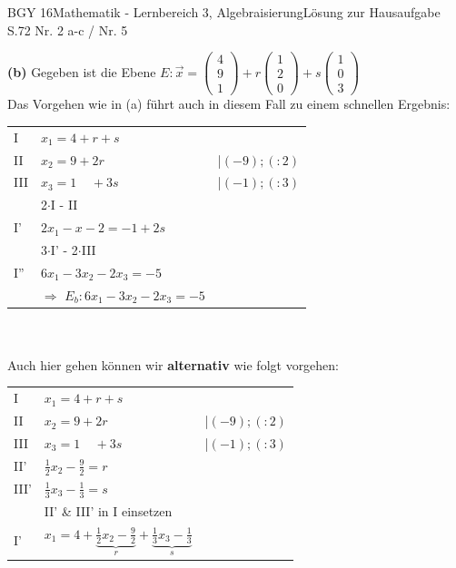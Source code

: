 \documentclass[oneside,openany,headings=optiontotoc,11pt,numbers=noenddot]{scrreprt}
\begin{document}
\begin{worksheet}{BGY 16}{Mathematik - Lernbereich 3, Algebraisierung}{Lösung zur Hausaufgabe S.72 Nr. 2 a-c / Nr. 5}
\begin{framed}
			\textbf{(b)} Gegeben ist die Ebene \(E:\vec{x} = \left(\begin{array}{c}4\\9\\1\end{array}\right) + r\left(\begin{array}{c}1\\2\\0\end{array}\right) + s\left(\begin{array}{c}1\\0\\3\end{array}\right)\)\\
			Das Vorgehen wie in (a) führt auch in diesem Fall zu einem schnellen Ergebnis:\\
			\begin{tabularx}{\textwidth}{lll}
				I & \(x_1 = 4 + r + s\)\\
				II & \(x_2 = 9 + 2r\) & |\((-9); (:2)\)\\
				III& \(x_3 =1\ \ \ \ \ + 3s\) & |\((-1);(:3)\)\\
				\hline
				& 2$\cdot$I - II\\
				I' & \(2x_1 -x-2 = -1 +2s\)\\
				& 3$\cdot$I' - 2$\cdot$III\\
				I'' & \(6x_1 - 3x_2 - 2x_3 = -5\)\\
				& $\Rightarrow$ \colorbox{green!10}{\(E_b: 6x_1 - 3x_2 - 2x_3 = -5\)}
			\end{tabularx}\\
			\hdashrule[0.5ex][x]{\textwidth}{0.1mm}{2mm 6pt}\\
			Auch hier gehen können wir \textbf{alternativ} wie folgt vorgehen:\\
			\begin{tabularx}{\textwidth}{lll}
				I & \(x_1 = 4 + r + s\)\\
				II & \(x_2 = 9 + 2r\) & |\((-9); (:2)\)\\
				III& \(x_3 =1\ \ \ \ \ + 3s\) & |\((-1);(:3)\)\\
				\hline
				II'& \(\frac{1}{2}x_2 - \frac{9}{2} = r\)\\
				III' & \(\frac{1}{3}x_3 -\frac{1}{3} = s\)\\
				& \multicolumn{2}{l}{II' \& III' in I einsetzen}\\
				I' & \(x_1 = 4 + \underbrace{\frac{1}{2}x_2 - \frac{9}{2}}_{r} + \underbrace{\frac{1}{3}x_3 -\frac{1}{3}}_{s}\)\\

\end{tabularx}
\end{framed}
\end{worksheet}
\end{document}
